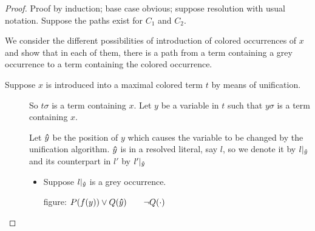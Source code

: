 \documentclass[,%
	paper=a4,%
	DIV11, %
	twoside=false,%
	liststotoc,
	bibtotoc,
	draft=false,%
	numbers=noendperiod
]{scrartcl}
\begin{document}
\begin{proof}
	\newcommand{\one}{\circled{1}}
	\newcommand{\two}{\circled{2}}
	Proof by induction; base case obvious; suppose resolution with usual notation.
	Suppose the paths exist for $C_1$ and $C_2$.

	We consider the different possibilities of introduction of colored occurrences of $x$ and show that in each of them, there is a path from a term containing a grey occurrence to a term containing the colored occurrence.

	\newcommand{\haty}{\bhat y}
	\newcommand{\hatyPrime}{\bhat y'}
	\begin{description}
		\item[Suppose $x$ is introduced into a maximal colored term $t$ by means of unification.]
			So $t\sigma$ is a term containing $x$.
			Let $y$ be a variable in $t$ such that $y\sigma$ is a term containing $x$.

			Let $\haty$ be the position of $y$ which causes the variable to be changed by the unification algorithm.
			$\haty$ is in a resolved literal, say $l$, so we denote it by $l\at{\haty}$ and its counterpart in $l'$ by $l'\at{\haty}$

			\begin{itemize}
					\item Suppose $l\at{\haty}$ is a grey occurrence.

						figure: $P(f(y)) \lor Q(\haty)\quad\quad\lnot Q(\cdot)$


\end{itemize}
\end{description}
\end{proof}
\end{document}
